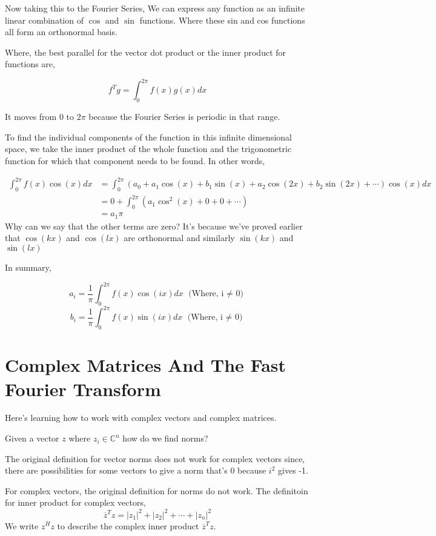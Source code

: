\documentclass[twoside]{report}
\begin{document}
Now taking this to the Fourier Series, 
We can express any function as an infinite linear combination of $\cos$ and $\sin$ functions. Where these sin and cos functions all form an orthonormal basis.

Where, the best parallel for the vector dot product or the inner product for functions are,

\[
	f^T g = \int_0^{2\pi} f(x) g(x) dx
\]

It moves from $0$ to $2\pi$ because the Fourier Series is periodic in that range. 

To find the individual components of the function in this infinite dimensional space, we take the inner product of the whole function and the trigonometric function for which that component needs to be found. In other words,

\begin{align*}
	\int_0^{2\pi} f(x) \cos(x) dx &= \int_0^{2\pi}(a_0 + a_1 \cos(x) + b_1 \sin(x) + a_2 \cos(2x) + b_2 \sin(2x) + \cdots ) \cos(x) dx \\
				      &=  0 + \int_0^{2\pi} (a_1\cos^2(x) + 0 + 0 + \cdots) \\
				      &= a_1\pi 
\end{align*}
Why can we say that the other terms are zero? It's because we've proved earlier that $\cos(kx)$ and $\cos(lx)$ are orthonormal and similarly $\sin(kx)$ and $\sin(lx)$

In summary,

\[
	a_i = \frac{1}{\pi} \int_0^{2\pi} f(x) \cos(i x) dx \text{ (Where, i $\neq$ 0)}
\]
\[
	b_i = \frac{1}{\pi} \int_0^{2\pi} f(x) \sin(i x) dx \text{ (Where, i $\neq$ 0)}
\]

\chapter{Complex Matrices And The Fast Fourier Transform}

Here's learning how to work with complex vectors and complex matrices.

Given a vector $z$ where $z_i \in \mathbb{C}^n$  how do we find norms?

The original definition for vector norms does not work for complex vectors since, there are possibilities for some vectors to give a norm that's 0 because $i^2$ gives -1.

For complex vectors, the original definition for norms do not work. The definitoin for inner product for complex vectors,
\[
	\overline{z}^T z = |z_1|^2 + |z_2|^2 + \cdots + |z_n|^2
\]
We write $z^H z$ to describe the complex inner product $\overline{z}^T z$.
\end{document}
